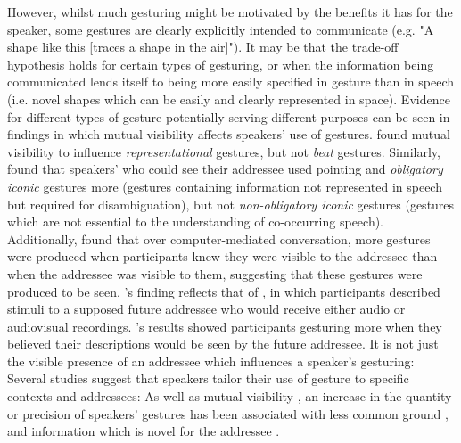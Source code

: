 \documentclass[a4paper,man,natbib]{apa6}
\newcommand*{\term}[1]{\emph{#1}} %
\begin{document}
However, whilst much gesturing might be motivated by the benefits it has for the speaker, some gestures are clearly explicitly intended to communicate (e.g. "A shape like this [traces a shape in the air]"). It may be that the trade-off hypothesis holds for certain types of gesturing, or when the information being communicated lends itself to being more easily specified in gesture than in speech (i.e. novel shapes which can be easily and clearly represented in space).
Evidence for different types of gesture potentially serving different purposes can be seen in findings in which mutual visibility affects speakers' use of gestures.
\citet{Alibali2001} found mutual visibility to influence \term{representational} gestures, but not \term{beat} gestures. 
Similarly, \citet{DeRuiter2012} found that speakers' who could see their addressee used pointing and \term{obligatory iconic} gestures more (gestures containing information not represented in speech but required for disambiguation), but not \term{non-obligatory iconic} gestures (gestures which are not essential to the understanding of co-occurring speech).\\


Additionally, \citet{Mol2011} found that over computer-mediated conversation, more gestures were produced when participants knew they were visible to the addressee than when the addressee was visible to them, suggesting that these gestures were produced to be seen. 
\citeauthor{Mol2011}'s finding reflects that of \citet{Bavelas2002}, in which participants described stimuli to a supposed future addressee who would receive either audio or audiovisual recordings. \citeauthor{Bavelas2002}'s results showed participants gesturing more when they believed their descriptions would be seen by the future addressee.
It is not just the visible presence of an addressee which influences a speaker's gesturing: Several studies suggest that speakers tailor their use of gesture to specific contexts and addressees:
As well as mutual visibility \citep{Alibali2001, Cohen1973, Hoetjes2015}, an increase in the quantity or precision of speakers' gestures has been associated with less common ground \citep{Gerwing2004, Holler2007}, and information which is novel for the addressee \citep{Jacobs2007}.\\
\end{document}
